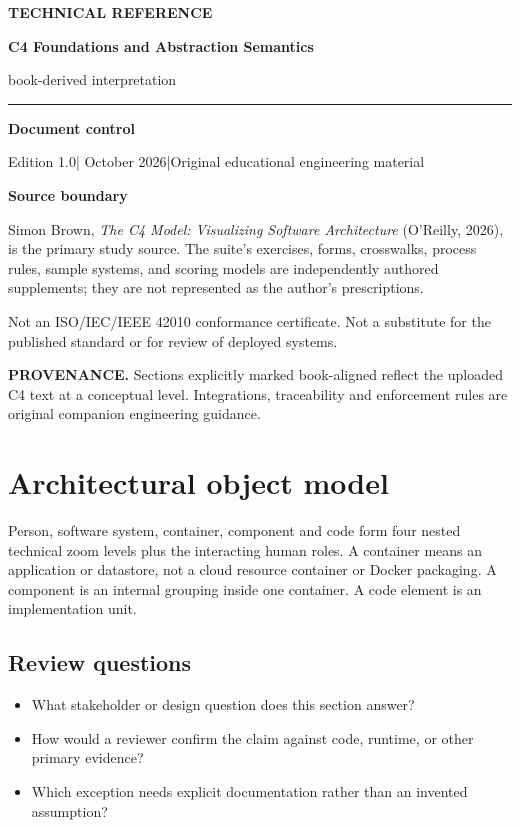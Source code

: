 \documentclass[10pt,letterpaper]{article}
\newcommand{\SourceNote}[1]{\par\smallskip\noindent\colorbox{C4Light}{\parbox{0.94\linewidth}{\footnotesize\textbf{PROVENANCE.} #1}}\par\medskip}
\newcommand{\DocStart}[3]{%
\begin{document}
\begin{titlepage}
\renewcommand{\thepage}{title-\arabic{page}}
\vspace*{0.55in}
{\sffamily\bfseries\small\color{C4Teal}#1}\par\vspace{0.24in}
{\sffamily\bfseries\fontsize{26}{31}\selectfont\color{C4Navy}#2}\par\vspace{0.18in}
{\large\color{C4Gray}#3}\par\vspace{0.4in}
\textcolor{C4Teal}{\rule{\linewidth}{1.15pt}}\par\vspace{0.24in}
\textbf{Document control}\par
Edition 1.0\quad|\quad 30 October 2026\quad|\quad Original educational engineering material\par
\vspace{0.17in}
\textbf{Source boundary}\par
Simon Brown, \emph{The C4 Model: Visualizing Software Architecture} (O'Reilly, 2026), is the primary study source. The suite's exercises, forms, crosswalks, process rules, sample systems, and scoring models are independently authored supplements; they are not represented as the author's prescriptions.\par
\vfill
{\small\color{C4Gray}Not an ISO/IEC/IEEE 42010 conformance certificate. Not a substitute for the published standard or for review of deployed systems.}\par
\end{titlepage}
}
\DocStart{TECHNICAL REFERENCE}{C4 Foundations and Abstraction Semantics}{book-derived interpretation}
\tableofcontents\clearpage
\SourceNote{Sections explicitly marked book-aligned reflect the uploaded C4 text at a conceptual level. Integrations, traceability and enforcement rules are original companion engineering guidance.}
\section{Architectural object model}
Person, software system, container, component and code form four nested technical zoom levels plus the interacting human roles. A container means an application or datastore, not a cloud resource container or Docker packaging. A component is an internal grouping inside one container. A code element is an implementation unit.


\subsection{Review questions}
\begin{itemize}
\item What stakeholder or design question does this section answer?
\item How would a reviewer confirm the claim against code, runtime, or other primary evidence?
\item Which exception needs explicit documentation rather than an invented assumption?
\end{itemize}
\end{document}
